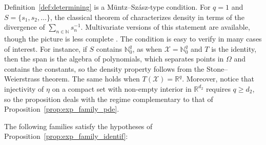 \documentclass[11pt,twoside]{article} %
\begin{document}
Definition~\ref{def:determining} is a Müntz--Szász-type condition. For $q=1$ and $S=\{s_1,s_2,\ldots\}$, the classical theorem of \cite{Muntz1914} characterizes density in terms of the divergence of $\sum_{n\in\mathbb N}s_n^{-1}$. Multivariate versions of this statement are available, though the picture is less complete \citep{Kroo1994GeometricMuntz,yang2014multivariate}. The condition is easy to verify in many cases of interest. For instance, if $S$ contains $\mathbb N_0^q$, as when $\mathcal X=\mathbb N_0^{q}$ and $T$ is the identity, then the span is the algebra of polynomials, which separates points in $\Omega$ and contains the constants, so the density property follows from the Stone--Weierstrass theorem. The same holds when $T(\mathcal X)=\mathbb R^{q}$. Moreover, notice that injectivity of $\eta$ on a compact set with non-empty interior in $\mathbb R^{d_2}$ requires $q\ge d_2$, so the proposition deals with the regime complementary to that of Proposition~\ref{prop:exp_family_pde}. %

The following families satisfy the hypotheses of Proposition~\ref{prop:exp_family_identif}:
\end{document}
